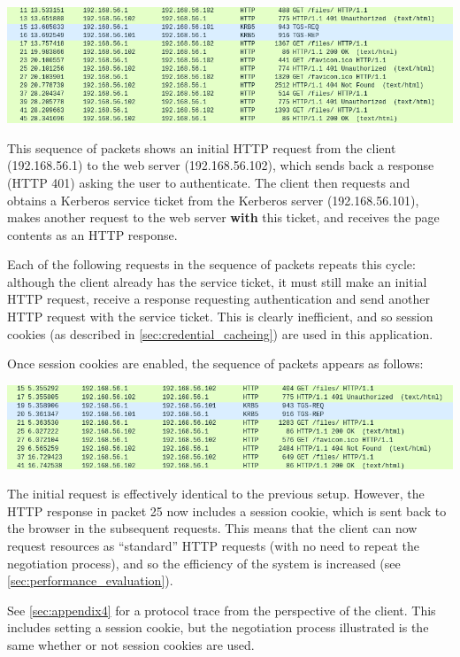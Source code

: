 \documentclass[12pt]{report}
\begin{document}
\begin{center}
  \includegraphics[width=\textwidth]{09-connect-no-cookie.png}
\end{center}

This sequence of packets shows an initial HTTP request from the client (192.168.56.1) to the web server (192.168.56.102), which sends back a response (HTTP 401) asking the user to authenticate. The client then requests and obtains a Kerberos service ticket from the Kerberos server (192.168.56.101), makes another request to the web server \textbf{with} this ticket, and receives the page contents as an HTTP response.

Each of the following requests in the sequence of packets repeats this cycle: although the client already has the service ticket, it must still make an initial HTTP request, receive a response requesting authentication and send another HTTP request with the service ticket. This is clearly inefficient, and so session cookies (as described in \autoref{sec:credential_cacheing}) are used in this application.

Once session cookies are enabled, the sequence of packets appears as follows:

\begin{center}
  \includegraphics[width=\textwidth]{10-connect-cookie.png}
\end{center}

The initial request is effectively identical to the previous setup. However, the HTTP response in packet 25 now includes a session cookie, which is sent back to the browser in the subsequent requests. This means that the client can now request resources as ``standard'' HTTP requests (with no need to repeat the negotiation process), and so the efficiency of the system is increased (see \autoref{sec:performance_evaluation}).

See \autoref{sec:appendix4} for a protocol trace from the perspective of the client. This includes setting a session cookie, but the negotiation process illustrated is the same whether or not session cookies are used.
\end{document}
